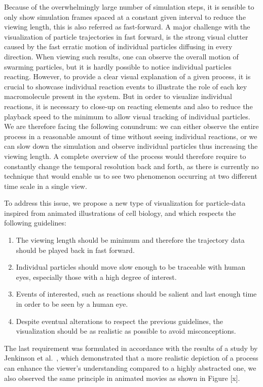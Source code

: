 Because of the overwhelmingly large number of simulation steps, it is sensible to only show simulation frames spaced at a constant given interval to reduce the viewing length, this is also referred as fast-forward.
A major challenge with the visualization of particle trajectories in fast forward, is the strong visual clutter caused by the fast erratic motion of individual particles diffusing in every direction.
When viewing such results, one can observe the overall motion of swarming particles, but it is hardly possible to notice individual particles reacting.
However, to provide a clear visual explanation of a given process, it is crucial to showcase individual reaction events to illustrate the role of each key macromolecule present in the system.
But in order to visualize individual reactions, it is necessary to close-up on reacting elements and also to reduce the playback speed to the minimum to allow visual tracking of individual particles.
We are therefore facing the following conundrum: we can either observe the entire process in a reasonable amount of time without seeing individual reactions, or we can slow down the simulation and observe individual particles thus increasing the viewing length.
A complete overview of the process would therefore require to constantly change the temporal resolution back and forth, as there is currently no technique that would enable us to see two phenomenon occurring at two different time scale in a single view.

To address this issue, we propose a new type of visualization for particle-data inspired from animated illustrations of cell biology, and which respects the following guidelines:
\begin{enumerate}
	\item The viewing length should be minimum and therefore the trajectory data should be played back in fast forward.	
	\item Individual particles should move slow enough to be traceable with human eyes, especially those with a high degree of interest.	
	\item Events of interested, such as reactions should be salient and last enough time in order to be seen by a human eye.	
	\item Despite eventual alterations to respect the previous guidelines, the visualization should be as realistic as possible to avoid misconceptions.
\end{enumerate}

The last requirement was formulated in accordance with the results of a study by Jenkinson et al.~\cite{jenkinson2012visualizing}, which demonstrated that a more realistic depiction of a process can enhance the viewer’s understanding compared to a highly abstracted one, we also observed the same principle in animated movies as shown in Figure [x].

